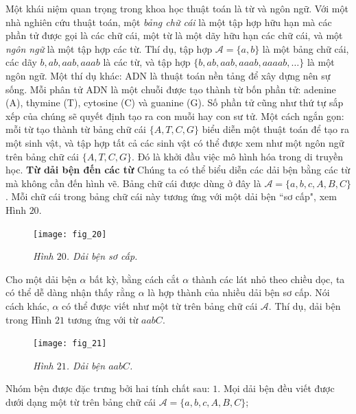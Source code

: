 \begin{multicols}{2}
	\vskip 0.1cm
	Một khái niệm quan trọng trong khoa học thuật toán là từ và ngôn ngữ. Với một nhà nghiên cứu thuật toán, một \textit{bảng chữ cái} là một tập hợp hữu hạn mà các phần tử được gọi là các chữ cái, một từ là một dãy hữu hạn các chữ cái, và một \textit{ngôn ngữ} là một tập hợp các từ. Thí dụ, tập hợp $\mathcal A = \{a, b\}$ là một bảng chữ cái, các dãy $b, ab, aab, aaab$ là các từ, và tập hợp $\{b, ab, aab, aaab, aaaab, \dots\}$ là một ngôn ngữ. Một thí dụ khác: ADN là thuật toán nền tảng để xây dựng nên sự sống. Mỗi phân tử ADN là một chuỗi được tạo thành từ bốn phần tử: adenine (A), thymine (T), cytosine (C) và guanine (G). Số phần tử cũng như thứ tự sắp xếp của chúng sẽ quyết định tạo ra con muỗi hay con sư tử. Một cách ngắn gọn: mỗi từ tạo thành từ bảng chữ cái $\{A, T, C, G\}$ biểu diễn một thuật toán để tạo ra một sinh vật, và tập hợp tất cả các sinh vật có thể được xem như một ngôn ngữ trên bảng chữ cái $\{A, T, C, G\}$. Đó là khởi đầu việc mô hình hóa trong di truyền học.
	\vskip 0.1cm
	\textbf{\color{duongvaotoanhoc}Từ dải bện đến các từ}
	\vskip 0.1cm
	Chúng ta có thể biểu diễn các dải bện bằng các từ mà không cần đến hình vẽ. Bảng chữ cái được dùng ở đây là $\mathcal A = \{a, b, c, A, B, C\}$. Mỗi chữ cái trong bảng chữ cái này tương ứng với một dải bện ``sơ cấp", xem Hình $20$.
	\begin{figure}[H]
		\vspace*{-5pt}
		\centering
		\captionsetup{labelformat= empty, justification=centering}
		\texttt{[image: fig\_20]}
		\caption{\small\textit{\color{duongvaotoanhoc}Hình $20$. Dải bện sơ cấp.}}
		\vspace*{-10pt}
	\end{figure}
	Cho một dải bện $\alpha$ bất kỳ, bằng cách cắt $\alpha$ thành các lát nhỏ theo chiều dọc, ta có thể dễ dàng nhận thấy rằng $\alpha$ là hợp thành của nhiều dải bện sơ cấp. Nói cách khác, $\alpha$ có thể được viết như một từ trên bảng chữ cái $\mathcal A$. Thí dụ, dải bện trong Hình $21$ tương ứng với từ $aabC$.
	\begin{figure}[H]
		\vspace*{-5pt}
		\centering
		\captionsetup{labelformat= empty, justification=centering}
		\texttt{[image: fig\_21]}
		\caption{\small\textit{\color{duongvaotoanhoc}Hình $21$. Dải bện $aabC$.}}
		\vspace*{-10pt}
	\end{figure}
	Nhóm bện được đặc trưng bởi hai tính chất sau:
	\vskip 0.1cm
	$1$. Mọi dải bện đều viết được dưới dạng một từ trên bảng chữ cái $\mathcal A = \{a, b, c, A, B, C\}$;

\end{multicols}
